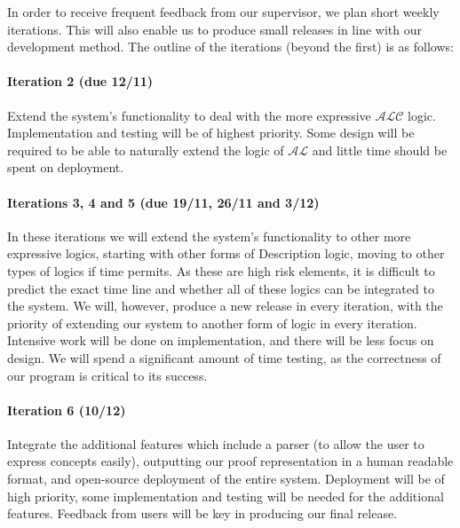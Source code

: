 In order to receive frequent feedback from our supervisor, we plan short weekly iterations. This will also enable us to produce small releases in line with our development method. The outline of the iterations (beyond the first) is as follows:

\paragraph{Iteration 2 (due 12/11)} Extend the system's functionality to deal with the more expressive $\mathcal{ALC}$ logic. Implementation and testing will be of highest priority. Some design will be required to be able to naturally extend the logic of $\mathcal{AL}$ and little time should be spent on deployment.

\paragraph{Iterations 3, 4 and 5 (due 19/11, 26/11 and 3/12)} In these iterations we will extend the system's functionality to other more expressive logics, starting with other forms of Description logic, moving to other types of logics if time permits. As these are high risk elements, it is difficult to predict the exact time line and whether all of these logics can be integrated to the system. We will, however, produce a new release in every iteration, with the priority of extending our system to another form of logic in every iteration. 
Intensive work will be done on implementation, and there will be less focus on design. We will spend a significant amount of time testing, as the correctness of our program is critical to its success.

\paragraph{Iteration 6 (10/12)} Integrate the additional features which include a parser (to allow the user to express concepts easily), outputting our proof representation in a human readable format, and open-source deployment of the entire system. Deployment will be of high priority, some implementation and testing will be needed for the additional features.
Feedback from users will be key in producing our final release.
